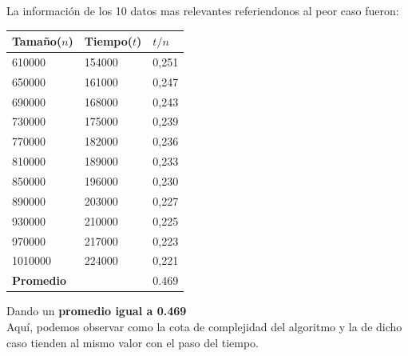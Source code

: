 La informaci\'on de los 10 datos mas relevantes referiendonos al peor caso fueron:

\begin{table}[H]

    \begin{tabular}{ | l | l |l |}
    \hline
	Tamaño($n$) & Tiempo($t$) & \textbf{$t /n$}  \\ \hline
610000 & 154000 & 0,251 \\ \hline
650000 & 161000 & 0,247 \\ \hline
690000 & 168000 & 0,243 \\ \hline
730000 & 175000 & 0,239 \\ \hline
770000 & 182000 & 0,236 \\ \hline
810000 & 189000 & 0,233 \\ \hline
850000 & 196000 & 0,230 \\ \hline
890000 & 203000 & 0,227 \\ \hline
930000 & 210000 & 0,225 \\ \hline
970000 & 217000 & 0,223 \\ \hline
1010000 & 224000 & 0,221 \\ \hline
    \textbf{Promedio} & & 0.469 \\ \hline

    \end{tabular}
\end{table}

Dando un \textbf{promedio igual a 0.469} \\

Aqu\'i, podemos observar como la cota de complejidad del algoritmo y la de dicho caso tienden al mismo valor con el paso del tiempo.\\